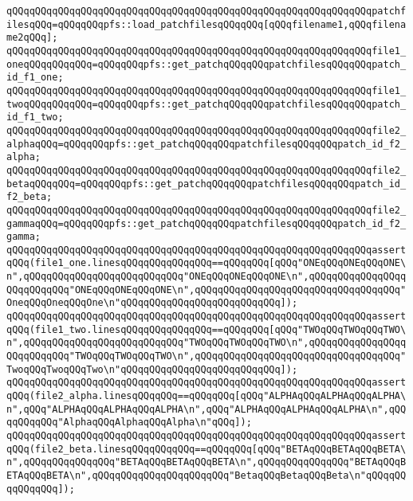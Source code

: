 \newline
\verb|qQQqqQQqqQQqqQQqqQQqqQQqqQQqqQQqqQQqqQQqqQQqqQQqqQQqqQQqqQQqqQQqpatchfilesqQQq=qQQqqQQqpfs::load_patchfilesqQQqqQQq[qQQqfilename1,qQQqfilename2qQQq];|\newline
\newline
\verb|qQQqqQQqqQQqqQQqqQQqqQQqqQQqqQQqqQQqqQQqqQQqqQQqqQQqqQQqqQQqqQQqfile1_oneqQQqqQQqqQQq=qQQqqQQqpfs::get_patchqQQqqQQqpatchfilesqQQqqQQqpatch_id_f1_one;|\newline
\verb|qQQqqQQqqQQqqQQqqQQqqQQqqQQqqQQqqQQqqQQqqQQqqQQqqQQqqQQqqQQqqQQqfile1_twoqQQqqQQqqQQq=qQQqqQQqpfs::get_patchqQQqqQQqpatchfilesqQQqqQQqpatch_id_f1_two;|\newline
\newline
\verb|qQQqqQQqqQQqqQQqqQQqqQQqqQQqqQQqqQQqqQQqqQQqqQQqqQQqqQQqqQQqqQQqfile2_alphaqQQq=qQQqqQQqpfs::get_patchqQQqqQQqpatchfilesqQQqqQQqpatch_id_f2_alpha;|\newline
\verb|qQQqqQQqqQQqqQQqqQQqqQQqqQQqqQQqqQQqqQQqqQQqqQQqqQQqqQQqqQQqqQQqfile2_betaqQQqqQQq=qQQqqQQqpfs::get_patchqQQqqQQqpatchfilesqQQqqQQqpatch_id_f2_beta;|\newline
\verb|qQQqqQQqqQQqqQQqqQQqqQQqqQQqqQQqqQQqqQQqqQQqqQQqqQQqqQQqqQQqqQQqfile2_gammaqQQq=qQQqqQQqpfs::get_patchqQQqqQQqpatchfilesqQQqqQQqpatch_id_f2_gamma;|\newline
\newline
\verb|qQQqqQQqqQQqqQQqqQQqqQQqqQQqqQQqqQQqqQQqqQQqqQQqqQQqqQQqqQQqqQQqassertqQQq(file1_one.linesqQQqqQQqqQQqqQQq==qQQqqQQq[qQQq"ONEqQQqONEqQQqONE\n",qQQqqQQqqQQqqQQqqQQqqQQqqQQq"ONEqQQqONEqQQqONE\n",qQQqqQQqqQQqqQQqqQQqqQQqqQQq"ONEqQQqONEqQQqONE\n",qQQqqQQqqQQqqQQqqQQqqQQqqQQqqQQqqQQq"OneqQQqOneqQQqOne\n"qQQqqQQqqQQqqQQqqQQqqQQqqQQq]);|\newline
\verb|qQQqqQQqqQQqqQQqqQQqqQQqqQQqqQQqqQQqqQQqqQQqqQQqqQQqqQQqqQQqqQQqassertqQQq(file1_two.linesqQQqqQQqqQQqqQQq==qQQqqQQq[qQQq"TWOqQQqTWOqQQqTWO\n",qQQqqQQqqQQqqQQqqQQqqQQqqQQq"TWOqQQqTWOqQQqTWO\n",qQQqqQQqqQQqqQQqqQQqqQQqqQQq"TWOqQQqTWOqQQqTWO\n",qQQqqQQqqQQqqQQqqQQqqQQqqQQqqQQqqQQq"TwoqQQqTwoqQQqTwo\n"qQQqqQQqqQQqqQQqqQQqqQQqqQQq]);|\newline
\newline
\verb|qQQqqQQqqQQqqQQqqQQqqQQqqQQqqQQqqQQqqQQqqQQqqQQqqQQqqQQqqQQqqQQqassertqQQq(file2_alpha.linesqQQqqQQq==qQQqqQQq[qQQq"ALPHAqQQqALPHAqQQqALPHA\n",qQQq"ALPHAqQQqALPHAqQQqALPHA\n",qQQq"ALPHAqQQqALPHAqQQqALPHA\n",qQQqqQQqqQQq"AlphaqQQqAlphaqQQqAlpha\n"qQQq]);|\newline
\verb|qQQqqQQqqQQqqQQqqQQqqQQqqQQqqQQqqQQqqQQqqQQqqQQqqQQqqQQqqQQqqQQqassertqQQq(file2_beta.linesqQQqqQQqqQQq==qQQqqQQq[qQQq"BETAqQQqBETAqQQqBETA\n",qQQqqQQqqQQqqQQq"BETAqQQqBETAqQQqBETA\n",qQQqqQQqqQQqqQQq"BETAqQQqBETAqQQqBETA\n",qQQqqQQqqQQqqQQqqQQqqQQq"BetaqQQqBetaqQQqBeta\n"qQQqqQQqqQQqqQQq]);|\newline
